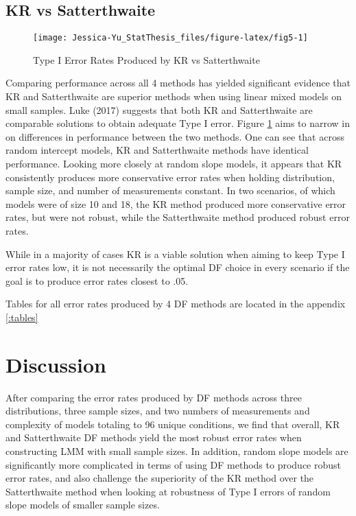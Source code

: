 \documentclass[12pt, twoside]{amherstthesis}
\begin{document}
\hypertarget{kr-vs-satterthwaite}{%
\subsection{KR vs Satterthwaite}\label{kr-vs-satterthwaite}}
\begin{figure}

{\centering \texttt{[image: Jessica-Yu\_StatThesis\_files/figure-latex/fig5-1]} 

}

\caption{Type I Error Rates Produced by KR vs Satterthwaite}\label{fig:fig5}
\end{figure}
Comparing performance across all 4 methods has yielded significant evidence that KR and Satterthwaite are superior methods when using linear mixed models on small samples. Luke (2017) suggests that both KR and Satterthwaite are comparable solutions to obtain adequate Type I error. Figure \ref{fig:fig5} aims to narrow in on differences in performance between the two methods. One can see that across random intercept models, KR and Satterthwaite methods have identical performance. Looking more closely at random slope models, it appears that KR consistently produces more conservative error rates when holding distribution, sample size, and number of measurements constant. In two scenarios, of which models were of size 10 and 18, the KR method produced more conservative error rates, but were not robust, while the Satterthwaite method produced robust error rates.

While in a majority of cases KR is a viable solution when aiming to keep Type I error rates low, it is not necessarily the optimal DF choice in every scenario if the goal is to produce error rates closest to .05.

Tables for all error rates produced by 4 DF methods are located in the appendix \ref{:tables}

\hypertarget{discussion}{%
\section{Discussion}\label{discussion}}

After comparing the error rates produced by DF methods across three distributions, three sample sizes, and two numbers of measurements and complexity of models totaling to 96 unique conditions, we find that overall, KR and Satterthwaite DF methods yield the most robust error rates when constructing LMM with small sample sizes. In addition, random slope models are significantly more complicated in terms of using DF methods to produce robust error rates, and also challenge the superiority of the KR method over the Satterthwaite method when looking at robustness of Type I errors of random slope models of smaller sample sizes.
\end{document}
